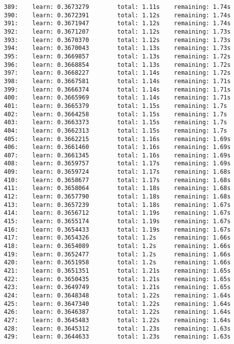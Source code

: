 \documentclass[11pt]{article}
\begin{document}
\begin{Verbatim}[commandchars=\\\{\}]
389:    learn: 0.3673279        total: 1.11s    remaining: 1.74s
390:    learn: 0.3672391        total: 1.12s    remaining: 1.74s
391:    learn: 0.3671947        total: 1.12s    remaining: 1.74s
392:    learn: 0.3671207        total: 1.12s    remaining: 1.73s
393:    learn: 0.3670370        total: 1.12s    remaining: 1.73s
394:    learn: 0.3670043        total: 1.13s    remaining: 1.73s
395:    learn: 0.3669857        total: 1.13s    remaining: 1.72s
396:    learn: 0.3668854        total: 1.13s    remaining: 1.72s
397:    learn: 0.3668227        total: 1.14s    remaining: 1.72s
398:    learn: 0.3667581        total: 1.14s    remaining: 1.71s
399:    learn: 0.3666374        total: 1.14s    remaining: 1.71s
400:    learn: 0.3665969        total: 1.14s    remaining: 1.71s
401:    learn: 0.3665379        total: 1.15s    remaining: 1.7s
402:    learn: 0.3664258        total: 1.15s    remaining: 1.7s
403:    learn: 0.3663373        total: 1.15s    remaining: 1.7s
404:    learn: 0.3662313        total: 1.15s    remaining: 1.7s
405:    learn: 0.3662215        total: 1.16s    remaining: 1.69s
406:    learn: 0.3661460        total: 1.16s    remaining: 1.69s
407:    learn: 0.3661345        total: 1.16s    remaining: 1.69s
408:    learn: 0.3659757        total: 1.17s    remaining: 1.69s
409:    learn: 0.3659724        total: 1.17s    remaining: 1.68s
410:    learn: 0.3658677        total: 1.17s    remaining: 1.68s
411:    learn: 0.3658064        total: 1.18s    remaining: 1.68s
412:    learn: 0.3657790        total: 1.18s    remaining: 1.68s
413:    learn: 0.3657239        total: 1.18s    remaining: 1.67s
414:    learn: 0.3656712        total: 1.19s    remaining: 1.67s
415:    learn: 0.3655174        total: 1.19s    remaining: 1.67s
416:    learn: 0.3654433        total: 1.19s    remaining: 1.67s
417:    learn: 0.3654326        total: 1.2s     remaining: 1.66s
418:    learn: 0.3654089        total: 1.2s     remaining: 1.66s
419:    learn: 0.3652477        total: 1.2s     remaining: 1.66s
420:    learn: 0.3651958        total: 1.2s     remaining: 1.66s
421:    learn: 0.3651351        total: 1.21s    remaining: 1.65s
422:    learn: 0.3650435        total: 1.21s    remaining: 1.65s
423:    learn: 0.3649749        total: 1.21s    remaining: 1.65s
424:    learn: 0.3648348        total: 1.22s    remaining: 1.64s
425:    learn: 0.3647340        total: 1.22s    remaining: 1.64s
426:    learn: 0.3646387        total: 1.22s    remaining: 1.64s
427:    learn: 0.3645483        total: 1.22s    remaining: 1.64s
428:    learn: 0.3645312        total: 1.23s    remaining: 1.63s
429:    learn: 0.3644633        total: 1.23s    remaining: 1.63s

\end{Verbatim}
\end{document}
